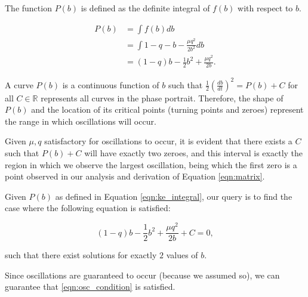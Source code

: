 \documentclass{article}
\begin{document}

The function $P(b)$ is defined as the definite integral of $f(b)$ with respect to $b$.

\begin{equation}
    \begin{aligned}
        P(b) &= \int f(b) db \\
        &= \int 1 - q - b - \frac{\mu q^2}{2 b^2} db \\
        &= (1-q)b - \frac{1}{2}b^2 + \frac{\mu q^2}{2b}.
    \end{aligned}
    \label{eqn:ke_integral}
\end{equation}

A curve $P(b)$ is a continuous function of $b$ such that $\frac{1}{2}\left(\frac{db}{dt}\right)^2 = P(b) +C$ for all $C \in \mathds{R}$
represents all curves in the phase portrait. Therefore, the shape of $P(b)$ and the location of its critical points (turning points and zeroes)
represent the range in which oscillations will occur.

Given $\mu, q$ satisfactory for oscillations to occur,
it is evident that there exists a $C$ such that $P(b)+C$ will have exactly two zeroes,
and this interval is exactly the region in which we observe the largest oscillation,
being which the first zero is a point observed in our analysis and derivation of Equation \ref{eqn:matrix}.

Given $P(b)$ as defined in Equation \ref{eqn:ke_integral},
our query is to find the case where the following equation is satisfied:

\begin{equation}
    (1-q)b - \frac{1}{2}b^2 + \frac{\mu q^2}{2b} + C = 0,
\end{equation}

such that there exist solutions for exactly $2$ values of $b$.

Since oscillations are guaranteed to occur (because we assumed so),
we can guarantee that \ref{eqn:osc_condition} is satisfied.











\end{document}
